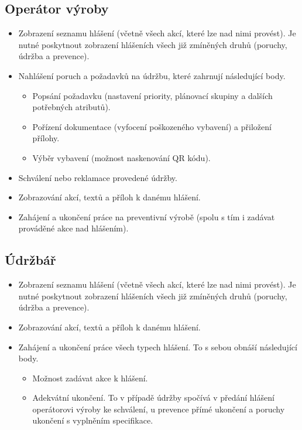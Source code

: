 \documentclass[thesis=M,czech]{FITthesis}[2012/06/26]
\begin{document}
\subsection{Operátor výroby}
\begin{itemize}
	\item
	Zobrazení seznamu hlášení (včetně všech akcí, které lze nad nimi provést). Je nutné poskytnout zobrazení hlášeních všech již zmíněných druhů (poruchy, údržba a prevence).
	\item
	Nahlášení poruch a požadavků na údržbu, které zahrnují následující body.
	\begin{itemize}
		\item
		Popsání požadavku (nastavení priority, plánovací skupiny a dalších potřebných atributů).
		\item
		Pořízení dokumentace (vyfocení poškozeného vybavení) a přiložení přílohy.
		\item
		Výběr vybavení (možnost naskenování QR kódu).
	\end{itemize} 
    \item
	Schválení nebo reklamace provedené údržby.
	\item
	Zobrazování akcí, textů a příloh k danému hlášení.
	\item
	Zahájení a ukončení práce na preventivní výrobě (spolu s tím i zadávat prováděné akce nad hlášením).
\end{itemize} 

\subsection{Údržbář}
\begin{itemize}
	\item
	Zobrazení seznamu hlášení (včetně všech akcí, které lze nad nimi provést). Je nutné poskytnout zobrazení hlášeních všech již zmíněných druhů (poruchy, údržba a prevence).
	\item
	Zobrazování akcí, textů a příloh k danému hlášení.
	\item
	Zahájení a ukončení práce všech typech hlášení. To s sebou obnáší následující body.
	\begin{itemize}
		\item
		Možnost zadávat akce k hlášení.
		\item
		Adekvátní ukončení. To v případě údržby spočívá v předání hlášení operátorovi výroby ke schválení, u prevence přímé ukončení a poruchy ukončení s vyplněním specifikace.
	\end{itemize} 
\end{itemize} 
\end{document}
